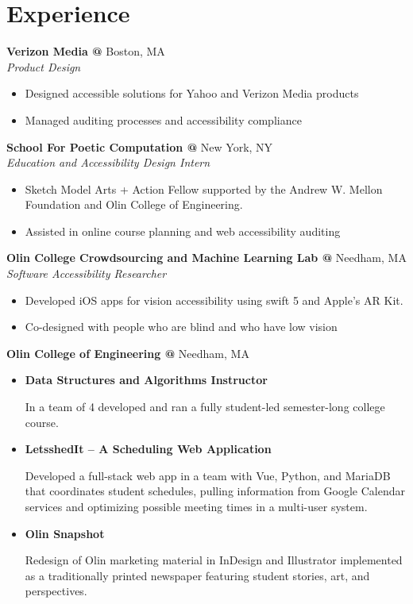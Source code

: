 \documentclass[10pt]{article} %
\begin{document}
\begin{minipage}[t]{0.8\textwidth}
\section*{Experience}
\textbf{Verizon Media @} \space Boston, MA \\
\textit{Product Design}\\
\begin{itemize} [noitemsep,topsep=0pt]
\item Designed accessible solutions for Yahoo and Verizon Media products
  \item Managed auditing processes and accessibility compliance
  \\
\end{itemize}
\textbf{School For Poetic Computation @} \space New York, NY\\
\textit{Education and Accessibility Design Intern}\\
\begin{itemize} [noitemsep,topsep=0pt]
  \item Sketch Model Arts + Action Fellow supported by the Andrew W. Mellon Foundation and Olin College of Engineering.
  \item Assisted in online course planning and web accessibility auditing
    \\
\end{itemize}
\textbf{Olin College Crowdsourcing and Machine Learning Lab @} \space Needham, MA\\
\textit{Software Accessibility Researcher}\\
\begin{itemize} [noitemsep,topsep=0pt]
  \item Developed iOS apps for vision accessibility using swift 5 and Apple’s AR Kit.
  \item Co-designed with people who are blind and who have low vision
  \\
\end{itemize}
\textbf{Olin College of Engineering @} \space Needham, MA\\
\begin{itemize} [noitemsep,topsep=0pt]
\item {}\textbf{Data Structures and Algorithms Instructor}
  
  In a team of 4 developed and ran a fully student-led semester-long college course.
\item {}\textbf{LetsshedIt – A Scheduling Web Application}

  Developed a full-stack web app in a team with Vue, Python, and MariaDB that coordinates student schedules, pulling information from Google Calendar services and optimizing possible meeting times in a multi-user system.
\item {}\textbf{Olin Snapshot }

   Redesign of Olin marketing material in InDesign and Illustrator implemented as a traditionally printed newspaper featuring student stories, art, and perspectives.
  \\
\end{itemize}
\end{minipage}
\end{document}
